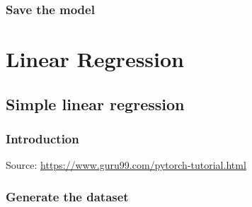 \documentclass[]{book}
\newenvironment{Shaded}{\begin{snugshade}}{\end{snugshade}}
\newcommand{\CommentTok}[1]{\textcolor[rgb]{0.56,0.35,0.01}{\textit{#1}}}
\newcommand{\DecValTok}[1]{\textcolor[rgb]{0.00,0.00,0.81}{#1}}
\newcommand{\KeywordTok}[1]{\textcolor[rgb]{0.13,0.29,0.53}{\textbf{#1}}}
\newcommand{\NormalTok}[1]{#1}
\newcommand{\OperatorTok}[1]{\textcolor[rgb]{0.81,0.36,0.00}{\textbf{#1}}}
\newcommand{\StringTok}[1]{\textcolor[rgb]{0.31,0.60,0.02}{#1}}
\begin{document}
\hypertarget{save-the-model}{%
\section{Save the model}\label{save-the-model}}

\begin{Shaded}
\end{Shaded}

\hypertarget{part-linear-regression}{%
\part{Linear Regression}\label{part-linear-regression}}

\hypertarget{simple-linear-regression}{%
\chapter{Simple linear regression}\label{simple-linear-regression}}

\hypertarget{introduction}{%
\section{Introduction}\label{introduction}}

Source: \url{https://www.guru99.com/pytorch-tutorial.html}

\begin{Shaded}
\end{Shaded}

\hypertarget{generate-the-dataset}{%
\section{Generate the dataset}\label{generate-the-dataset}}
\end{document}
